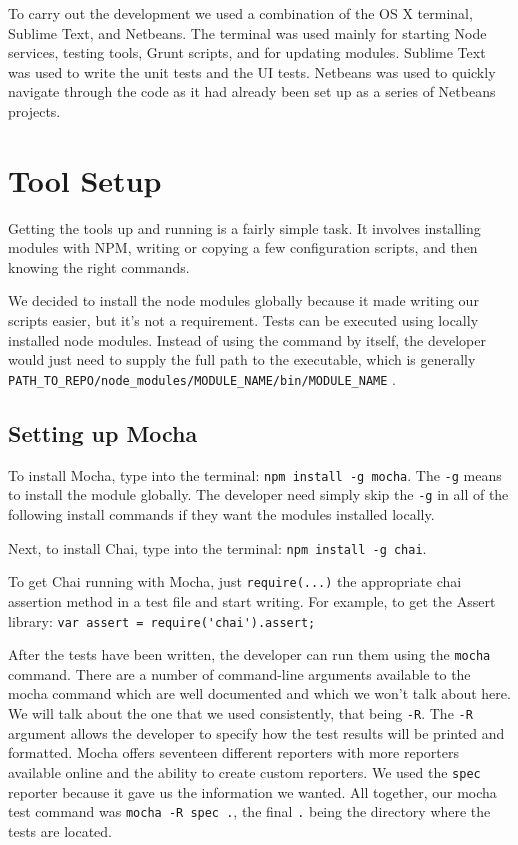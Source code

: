 \documentclass[12pt]{ucthesis}
\begin{document}
To carry out the development we used a combination of the OS X terminal, Sublime Text, and Netbeans. The terminal was used mainly for starting Node services, testing tools, Grunt scripts, and for updating modules. Sublime Text was used to write the unit tests and the UI tests. Netbeans was used to quickly navigate through the code as it had already been set up as a series of Netbeans projects.

\section{Tool Setup}
Getting the tools up and running is a fairly simple task. It involves installing modules with NPM, writing or copying a few configuration scripts, and then knowing the right commands.

We decided to install the node modules globally because it made writing our scripts easier, but it's not a requirement. Tests can be executed using locally installed node modules. Instead of using the command by itself, the developer would just need to supply the full path to the executable, which is generally \lstinline{PATH_TO_REPO/node_modules/MODULE_NAME/bin/MODULE_NAME} \space .

\subsection{Setting up Mocha}
To install Mocha, type into the terminal: \lstinline{npm install -g mocha}. The \lstinline{-g} means to install the module globally. The developer need simply skip the \lstinline{-g} in all of the following install commands if they want the modules installed locally.

Next, to install Chai, type into the terminal: \lstinline{npm install -g chai}.

To get Chai running with Mocha, just \lstinline{require(...)} the appropriate chai assertion method in a test file and start writing. For example, to get the Assert library: \lstinline{var assert = require('chai').assert;}

After the tests have been written, the developer can run them using the \lstinline{mocha} command. There are a number of command-line arguments available to the mocha command which are well documented and which we won't talk about here. We will talk about the one that we used consistently, that being \lstinline{-R}. The \lstinline{-R} argument allows the developer to specify how the test results will be printed and formatted. Mocha offers seventeen different reporters with more reporters available online and the ability to create custom reporters. We used the \lstinline{spec} reporter because it gave us the information we wanted. All together, our mocha test command was \lstinline{mocha -R spec .}, the final \lstinline{.} being the directory where the tests are located.
\end{document}
